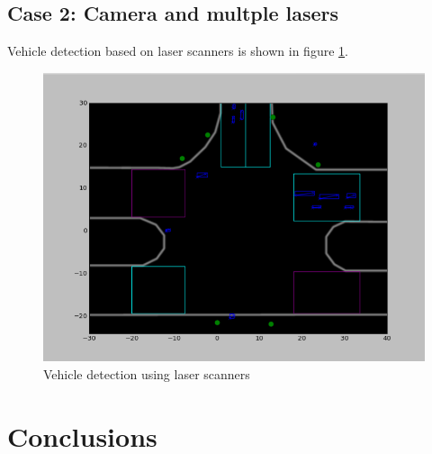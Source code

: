 \subsection{Case 2: Camera and multple lasers}

Vehicle detection based on laser scanners is shown in figure \ref{laser_detection}.

\begin{figure}[ht!]
\centering
\includegraphics[scale=0.43]{fig/4/laser1.png}
\caption{Vehicle detection using laser scanners}
\label{laser_detection}
\end{figure}

\section{Conclusions}


